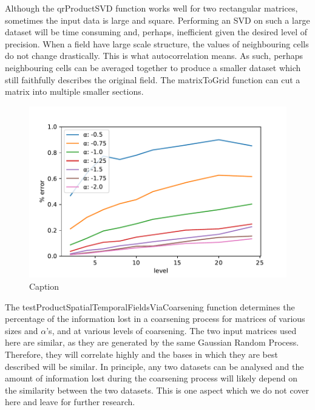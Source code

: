 \documentclass{acm_proc_article-sp}
\begin{document}
Although the qrProductSVD function works well for two rectangular matrices, sometimes the input data is large and square. Performing an SVD on such a large dataset will be time consuming and, perhaps, inefficient given the desired level of precision. When a field have large scale structure, the values of neighbouring cells do not change drastically. This is what autocorrelation means. As such, perhaps neighbouring cells can be averaged together to produce a smaller dataset which still faithfully describes the original field. The matrixToGrid function can cut a matrix into multiple smaller sections.


\begin{figure}[h]
\begin{center}
\includegraphics[scale=0.5]{Results/plotSingleSpatialFieldViaCoarsening.pdf}
\caption[Small caption]{Caption}
\label{fig:plotSingleSpatialFieldViaCoarsening}
\end{center}
\end{figure}

The testProductSpatialTemporalFieldsViaCoarsening function determines the percentage of the information lost in a coarsening process for matrices of various sizes and $\alpha$'s, and at various levels of coarsening. The two input matrices used here are similar, as they are generated by the same Gaussian Random Process. Therefore, they will correlate highly and the bases in which they are best described will be similar. In principle, any two datasets can be analysed and the amount of information lost during the coarsening process will likely depend on the similarity between the two datasets. This is one aspect which we do not cover here and leave for further research.
\end{document}
